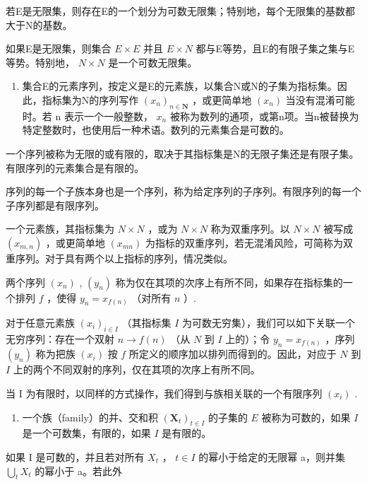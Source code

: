 若E是无限集，则存在E的一个划分为可数无限集；特别地，每个无限集的基数都大于N的基数。

如果E是无限集，则集合 \(E \times E\) 并且 \(E \times N\) 都与E等势，且E的有限子集之集与E等势。特别地， \(N \times N\) 是一个可数无限集。

\begin{enumerate}
\def\labelenumi{\arabic{enumi}.}
\setcounter{enumi}{7}
\tightlist
\item
  集合E的元素序列，按定义是E的元素族，以集合N或N的子集为指标集。因此，指标集为N的序列写作 \((x_{n})_{n\in\mathbf{N}}\) ，或更简单地 \((x_{n})\) 当没有混淆可能时。若 n 表示一个一般整数， \(x_{n}\) 被称为数列的通项，或第n项。当n被替换为特定整数时，也使用后一种术语。数列的元素集合是可数的。
\end{enumerate}

一个序列被称为无限的或有限的，取决于其指标集是N的无限子集还是有限子集。有限序列的元素集合是有限的。

序列的每一个子族本身也是一个序列，称为给定序列的子序列。有限序列的每一个子序列都是有限序列。

一个元素族，其指标集为 \(N \times N\) ，或为 \(N \times N\) 称为双重序列。以 \(N \times N\) 被写成 \((x_{m,n})\) ，或更简单地 \((x_{mn})\) 为指标的双重序列，若无混淆风险，可简称为双重序列。对于具有两个以上指标的序列，情况类似。

两个序列 \((x_{n})\) , \((y_{n})\) 称为仅在其项的次序上有所不同，如果存在指标集的一个排列 \(f\) ，使得 \(y_{n} = x_{f(n)}\) （对所有 \(n\) ）.

对于任意元素族 \((x_{i})_{i\in I}\) （其指标集 \(I\) 为可数无穷集），我们可以如下关联一个无穷序列：存在一个双射 \(n\to f(n)\) （从 \(N\) 到 \(I\) 上的）；令 \(y_{n} = x_{f(n)}\) ，序列 \((y_{n})\) 称为把族 \((x_{i})\) 按 \(f\) 所定义的顺序加以排列而得到的。因此，对应于 \(N\) 到 \(I\) 上的两个不同双射的序列，仅在其项的次序上有所不同。

当 I 为有限时，以同样的方式操作，我们得到与族相关联的一个有限序列 \((x_{i})\) .

\begin{enumerate}
\def\labelenumi{\arabic{enumi}.}
\setcounter{enumi}{8}
\tightlist
\item
  一个族（family）的并、交和积 \((\mathbf{X}_t)_{t\in I}\) 的子集的 \(E\) 被称为可数的，如果 \(I\) 是一个可数集，有限的，如果 \(I\) 是有限的。
\end{enumerate}

如果 I 是可数的，并且若对所有 \(X_{t}\) ， \(t \in I\) 的幂小于给定的无限幂 a，则并集 \(\bigcup_{t} X_{t}\) 的幂小于 a。若此外

